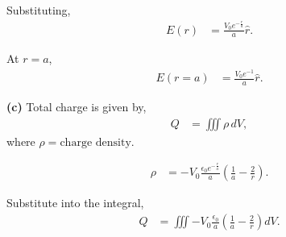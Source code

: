 \documentclass{article}
\begin{document}
Substituting,
\begin{align*}
E(r) &= \frac{V_0 e^{-\frac{r}{a}}}{a} \hat{r}.
\end{align*}

At $ r = a $,
\begin{align*}
E(r=a) &= \frac{V_0 e^{-1}}{a} \hat{r}.
\end{align*}

\textbf{(c)} Total charge is given by,
\begin{align*}
Q &= \iiint \rho \, dV,
\end{align*}
where $\rho = \text{charge density}$.

\begin{align*}
\rho &= -V_0 \frac{\epsilon_0 e^{-\frac{r}{a}}}{a} \left( \frac{1}{a} - \frac{2}{r} \right).
\end{align*}

Substitute into the integral,
\begin{align*}
Q &= \iiint -V_0 \frac{\epsilon_0}{a} \left( \frac{1}{a} - \frac{2}{r} \right) dV.
\end{align*}
\end{document}
